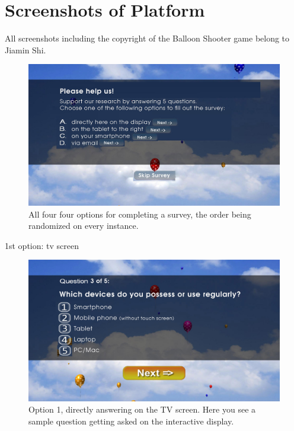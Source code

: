 
\section{Screenshots of Platform}
\label{appendix:screenshots-balloon-shooter}

    All screenshots including the copyright of the Balloon Shooter game belong to Jiamin Shi. 
    
    \begin{figure}
        \begin{center}
            \includegraphics[width=\columnwidth]{img/screenshots/options-overview.jpg}
        \end{center}
     \caption{All four four options for completing a survey, the order being randomized on every instance.}
     \label{screenshot:options}
    \end{figure}


    1st option: tv screen

    \begin{figure}
        \begin{center}
            \includegraphics[width=\columnwidth]{img/screenshots/option-tv.jpg}
        \end{center}
     \caption{Option 1, directly answering on the TV screen. Here you see a sample question getting asked on the interactive display.}
     \label{screenshot:tv-option}
    \end{figure}


